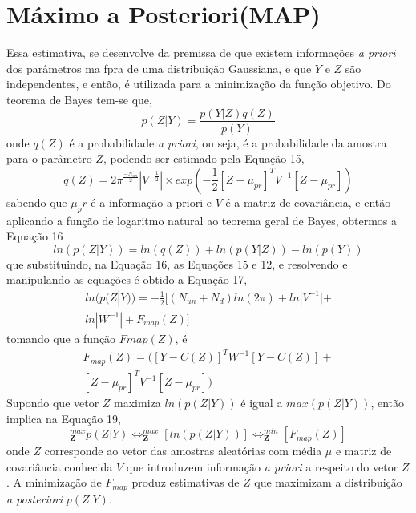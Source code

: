 \documentclass[por]{Template_SBEF}
\begin{document}
\section{Máximo a Posteriori(MAP)}
Essa estimativa, se desenvolve da premissa de que existem informações \textit{a priori} dos parâmetros ma fpra de uma distribuição Gaussiana, e que $Y$ e $Z$ são independentes, e então, é utilizada para a minimização da função objetivo. Do teorema de Bayes tem-se que,
\begin{equation}
p(Z|Y)= \frac{p(Y|Z)q(Z)}{p(Y)}
\end{equation}
onde $q(Z)$ é a probabilidade \textit{a priori}, ou seja, é a probabilidade da amostra para o parâmetro $Z$, podendo ser estimado pela Equação 15,
\begin{equation}
q(Z)=2\pi^{\frac{-N_{un}}{2}}|V^{-\frac{1}{2}}| \times exp(-\frac{1}{2}[Z-\mu_{pr}]^T V^{-1}[Z-\mu_{pr}])
\end{equation} 
sabendo que $\mu_pr$ é a informação a priori e $V$ é a matriz de covariância, e então aplicando a função de logaritmo natural ao teorema geral de Bayes, obtermos a Equação 16
\begin{equation}
ln(p(Z|Y))=ln(q(Z))+ln(p(Y|Z))-ln(p(Y))
\end{equation}
que substituindo, na Equação 16, as Equações 15 e 12, e resolvendo e manipulando as equações é obtido a Equação 17,
\begin{equation}
\begin{split}
ln(p(Z|Y)) = -\frac{1}{2}[(N_{un}+N_d)ln(2\pi)+ln|V^{-1}|+\\
ln|W^{-1}|+F_{map}(Z)]
\end{split}
\end{equation} 
tomando que a função $F{map}(Z)$, é
\vspace{10pt}
\begin{equation}
\begin{split}
F_{map}(Z)=([Y-C(Z)]^TW^{-1}[Y-C(Z)]+\\
[Z- \mu_{pr}]^T V^{-1}[Z-\mu_{pr}])
\end{split}
\end{equation}
Supondo que vetor $Z$ maximiza $ln(p(Z|Y))$ é igual a $max(p(Z|Y))$, então implica na Equação 19,
\begin{equation}
_\mathbf{Z}^{max} p(Z|Y) \Leftrightarrow _\mathbf{Z}^{max} [ln(p(Z|Y))] \Leftrightarrow _\mathbf{Z}^{min} [F_{map}(Z)]
\end{equation}
onde $Z$ corresponde ao vetor das amostras aleatórias com média $\mu$ e matriz de covariância conhecida $V$ que introduzem informação \textit{a priori} a respeito do vetor $Z$. A minimização de $F_{map}$ produz estimativas de $Z$ que maximizam a distribuição \textit{a posteriori} $p(Z|Y)$.
\end{document}
